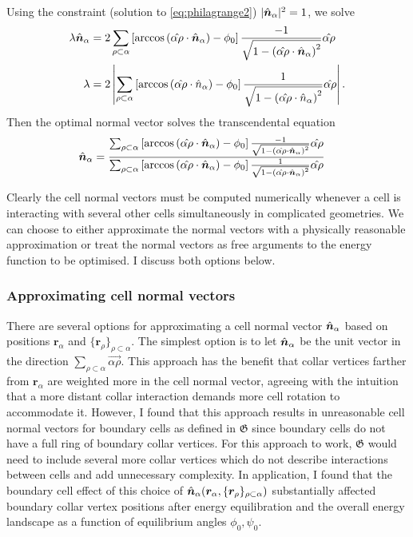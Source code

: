 Using the constraint (solution to \cref{eq:philagrange2}) $| \hat{\bm{n}}_\alpha |^2 = 1$, we solve 
\begin{align*} 
    \lambda \hat{\bm{n}}_\alpha &= 2 \sum_{\rho\subset\alpha} \left[ \arccos\left(\hat{\alpha\rho} \cdot \hat{\bm{n}}_\alpha \right) - \phi_0 \right] \frac{-1}{\sqrt{1 - \left(\hat{\alpha\rho} \cdot \hat{\bm{n}}_\alpha \right)^2 }} \hat{\alpha\rho} \\
    \lambda &= 2 \left| \sum_{\rho\subset\alpha} \left[ \arccos\left(\hat{\alpha\rho} \cdot \hat{n}_\alpha \right) - \phi_0 \right] \frac{1}{\sqrt{1 - \left(\hat{\alpha\rho} \cdot \hat{n}_\alpha \right)^2 }} \hat{\alpha\rho} \right|.  
\end{align*}
\noindent Then the optimal normal vector solves the transcendental equation 
\begin{align}
    \hat{\bm{n}}_\alpha &= \frac{\sum_{\rho\subset\alpha} \left[ \arccos\left(\hat{\alpha\rho} \cdot \hat{\bm{n}}_\alpha \right) - \phi_0 \right] \frac{-1}{\sqrt{1 - \left(\hat{\alpha\rho} \cdot \hat{\bm{n}}_\alpha \right)^2 }} \hat{\alpha\rho} }{\sum_{\rho\subset\alpha} \left[ \arccos\left(\hat{\alpha\rho} \cdot \hat{\bm{n}}_\alpha \right) - \phi_0 \right] \frac{1}{\sqrt{1 - \left(\hat{\alpha\rho} \cdot \hat{\bm{n}}_\alpha \right)^2 }} \hat{\alpha\rho}} \label{eq:optimal_n}
\end{align}

Clearly the cell normal vectors must be computed numerically whenever a cell is interacting with several other cells simultaneously in complicated geometries. 
We can choose to either approximate the normal vectors with a physically reasonable approximation or treat the normal vectors as free arguments to the energy function to be optimised.
I discuss both options below. 

\subsubsection{Approximating cell normal vectors} \label{subsubsec:approx_norm}

There are several options for approximating a cell normal vector $\hat{\bm{n}}_\alpha$ based on positions $\bm{r}_\alpha$ and $\{ \bm{r}_\rho\}_{\rho\subset\alpha}$.
The simplest option is to let $\hat{\bm{n}}_\alpha$ be the unit vector in the direction $\sum_{\rho\subset\alpha}\vec{\alpha\rho}$. 
This approach has the benefit that collar vertices farther from $\bm{r}_\alpha$ are weighted more in the cell normal vector, agreeing with the intuition that a more distant collar interaction demands more cell rotation to accommodate it. 
However, I found that this approach results in unreasonable cell normal vectors for boundary cells as defined in $\mathfrak{G}$ since boundary cells do not have a full ring of boundary collar vertices. 
For this approach to work, $\mathfrak{G}$ would need to include several more collar vertices which do not describe interactions between cells and add unnecessary complexity.
In application, I found that the boundary cell effect of this choice of $\hat{\bm{n}}_\alpha(\bm{r}_\alpha, \{\bm{r}_\rho\}_{\rho\subset\alpha})$ substantially affected boundary collar vertex positions after energy equilibration and the overall energy landscape as a function of equilibrium angles $\phi_0, \psi_0$. 

